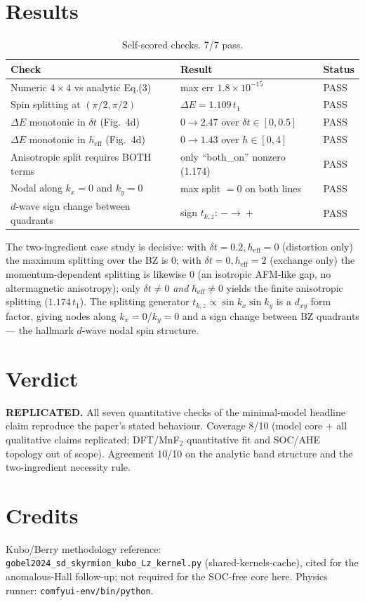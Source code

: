 \documentclass[11pt]{article}
\begin{document}
\section{Results}
\begin{table}[h]\centering
\begin{tabular}{lll}
\toprule
Check & Result & Status \\
\midrule
Numeric $4\times4$ vs analytic Eq.(3) & max err $1.8\times10^{-15}$ & PASS \\
Spin splitting at $(\pi/2,\pi/2)$ & $\Delta E = 1.109\,t_1$ & PASS \\
$\Delta E$ monotonic in $\delta t$ (Fig.\ 4d) & $0\to2.47$ over $\delta t\in[0,0.5]$ & PASS \\
$\Delta E$ monotonic in $h_{\text{eff}}$ (Fig.\ 4d) & $0\to1.43$ over $h\in[0,4]$ & PASS \\
Anisotropic split requires BOTH terms & only ``both\_on'' nonzero (1.174) & PASS \\
Nodal along $k_x{=}0$ and $k_y{=}0$ & max split $=0$ on both lines & PASS \\
$d$-wave sign change between quadrants & sign $t_{k,z}$: $-\!\to\!+$ & PASS \\
\bottomrule
\end{tabular}
\caption{Self-scored checks. 7/7 pass.}
\end{table}

The two-ingredient case study is decisive: with $\delta t{=}0.2,h_{\text{eff}}{=}0$
(distortion only) the maximum splitting over the BZ is $0$; with
$\delta t{=}0,h_{\text{eff}}{=}2$ (exchange only) the momentum-dependent
splitting is likewise $0$ (an isotropic AFM-like gap, no altermagnetic
anisotropy); only $\delta t{\neq}0$ \emph{and} $h_{\text{eff}}{\neq}0$ yields the
finite anisotropic splitting ($1.174\,t_1$). The splitting generator
$t_{k,z}\propto\sin k_x\sin k_y$ is a $d_{xy}$ form factor, giving nodes along
$k_x{=}0$/$k_y{=}0$ and a sign change between BZ quadrants --- the hallmark
$d$-wave nodal spin structure.

\section{Verdict}
\textbf{REPLICATED.} All seven quantitative checks of the minimal-model headline
claim reproduce the paper's stated behaviour. Coverage 8/10 (model core + all
qualitative claims replicated; DFT/MnF$_2$ quantitative fit and SOC/AHE
topology out of scope). Agreement 10/10 on the analytic band structure and the
two-ingredient necessity rule.

\section{Credits}
Kubo/Berry methodology reference: \texttt{gobel2024\_sd\_skyrmion\_kubo\_Lz\_kernel.py}
(shared-kernels-cache), cited for the anomalous-Hall follow-up; not required for
the SOC-free core here. Physics runner: \texttt{comfyui-env/bin/python}.
\end{document}
